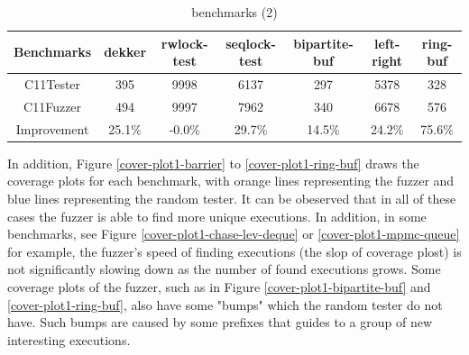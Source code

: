 \begin{table}[h!]
	\begin{tabular}{ |c|cccccc| }
		\hline
		Benchmarks  & dekker & rwlock-test & seqlock-test & bipartite-buf & left-right & ring-buf \\
		\hline 
		C11Tester   & 395    & 9998        & 6137         & 297           & 5378       & 328      \\
		C11Fuzzer   & 494    & 9997        & 7962         & 340           & 6678       & 576      \\
		\hline
        Improvement &25.1\%  & -0.0\%     & 29.7\%        & 14.5\%        & 24.2\%     &75.6\%\\
        \hline
	\end{tabular}
	\caption{benchmarks (2)}
	\label{c11fuzzer-bench2}
\end{table}


In addition, Figure \ref{cover-plot1-barrier} to \ref{cover-plot1-ring-buf} draws the coverage plots for each benchmark, with orange lines representing the fuzzer and blue lines representing the random tester. It can be obeserved that in all of these cases the fuzzer is able to find more unique executions. In addition, in some benchmarks, see Figure \ref{cover-plot1-chase-lev-deque} or \ref{cover-plot1-mpmc-queue} for example, the fuzzer's speed of finding executions (the slop of coverage plost) is not significantly slowing down as the number of found executions grows. Some coverage plots of the fuzzer, such as in Figure \ref{cover-plot1-bipartite-buf} and \ref{cover-plot1-ring-buf}, also have some "bumps" which the random tester do not have. Such bumps are caused by some prefixes that guides to a group of new interesting executions.

